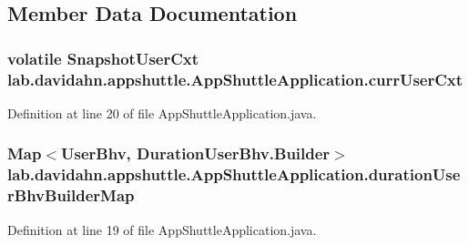 \subsection{\-Member \-Data \-Documentation}
\hypertarget{classlab_1_1davidahn_1_1appshuttle_1_1_app_shuttle_application_abad87ce8605d542e59bb402ceaff671f}{
\subsubsection[{curr\-User\-Cxt}]{\setlength{\rightskip}{0pt plus 5cm}volatile {\bf \-Snapshot\-User\-Cxt} {\bf lab.\-davidahn.\-appshuttle.\-App\-Shuttle\-Application.\-curr\-User\-Cxt}}}\label{classlab_1_1davidahn_1_1appshuttle_1_1_app_shuttle_application_abad87ce8605d542e59bb402ceaff671f}


\-Definition at line 20 of file \-App\-Shuttle\-Application.\-java.

\hypertarget{classlab_1_1davidahn_1_1appshuttle_1_1_app_shuttle_application_a42e05ff1c1e85fe0d8178d5f6db08c8d}{
\subsubsection[{duration\-User\-Bhv\-Builder\-Map}]{\setlength{\rightskip}{0pt plus 5cm}\-Map$<${\bf \-User\-Bhv}, \-Duration\-User\-Bhv.\-Builder$>$ {\bf lab.\-davidahn.\-appshuttle.\-App\-Shuttle\-Application.\-duration\-User\-Bhv\-Builder\-Map}}}\label{classlab_1_1davidahn_1_1appshuttle_1_1_app_shuttle_application_a42e05ff1c1e85fe0d8178d5f6db08c8d}


\-Definition at line 19 of file \-App\-Shuttle\-Application.\-java.

